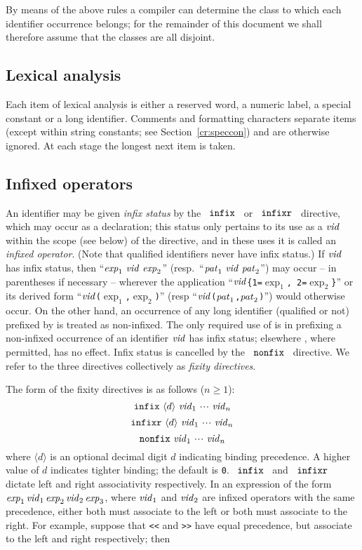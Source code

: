 By means of the above rules a compiler can determine the class to which each
identifier occurrence belongs; for the remainder of this document we shall
therefore assume that the classes are all disjoint.

\subsection{Lexical analysis}
Each item of lexical analysis is either a reserved word, a numeric label, a
special constant or a long identifier.
Comments and formatting characters
separate items (except within string constants; see Section~\ref{cr:speccon})
and are otherwise
ignored.   At each stage the longest next item is taken.

\subsection{Infixed operators}
\label{infop.sec}
An identifier may be given {\sl infix status} by the
~${\tt infix}$~ or ~${\tt infixr}$~ directive, which may occur as a
declaration; this status only pertains to its use as a 
${\it vid}$ within the scope (see below) of the 
directive, and in these uses it is called an {\sl infixed operator}.
(Note that qualified identifiers never have infix status.)  If 
${\it vid}$
has infix status, then ``${\it exp}_1\ {\it vid}\ {\it exp}_2$''
(resp.\ ``${\it pat}_1\ {\it vid}\ {\it pat}_2$'') may occur -- in parentheses if necessary -- wherever
the application ``${\it vid}$\verb+{+{\tt 1=}$\exp_1$\verb+,+{\tt
2=}$\exp_2$\verb+}+'' or its derived form
``${\it vid}$\verb+(+$\exp_1$\verb+,+$\exp_2$\verb+)+'' (resp
``${\it vid}$\verb+(+${\it pat}_1$\verb+,+${\it pat}_2$\verb+)+'') would otherwise
occur.  On the other hand, an occurrence of any long identifier (qualified
or not) prefixed by {\OP} is treated as non-infixed. The only required
use of {\OP} is in prefixing a non-infixed occurrence of an
identifier ${\it vid}$  has infix status; elsewhere {\OP}, where
permitted, has no effect.
Infix status is cancelled by the ~${\tt nonfix}$~
directive.  We refer to the three directives collectively as {\sl fixity directives}.

The form of the fixity directives is as follows ($n\geq 1$):
\[ \mbox{${\tt infix}\ \langle d\rangle\ {\it vid}_1\ \mbox{$\cdot\!\cdot\!\cdot$}\ {\it vid}_n$} \]
\[ \mbox{${\tt infixr}\ \langle d\rangle\ {\it vid}_1\ \mbox{$\cdot\!\cdot\!\cdot$}\ {\it vid}_n$} \]
\[ \mbox{${\tt nonfix}\ {\it vid}_1\ \mbox{$\cdot\!\cdot\!\cdot$}\ {\it vid}_n$} \] where $\langle d\rangle$ is an optional decimal digit $d$ indicating
binding precedence. A higher value of $d$ indicates tighter binding;
the default is {\tt 0}. ~${\tt infix}$~ and ~${\tt infixr}$~ dictate left and right
associativity respectively. In an expression of the form  ${\it exp}_1\, {\it vid}_1\, {\it exp}_2\, {\it vid}_2\, {\it exp}_3$, where
      ${\it vid}_1$ and ${\it vid}_2$ are infixed operators with the same precedence, 
      either both must associate to the left or both must
associate to the right.
For example, suppose that {\tt <<} and {\tt >>} have equal precedence,
but associate to the left and right respectively; then
\medskip

